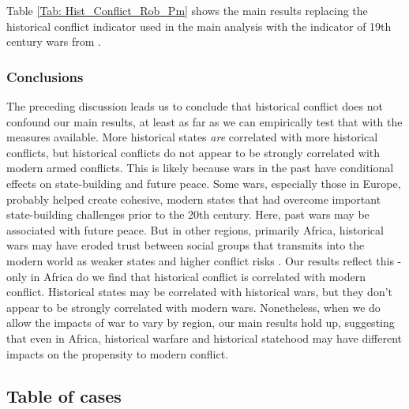 \documentclass[12pt]{article}
\begin{document}
Table \ref{Tab: Hist_Conflict_Rob_Pm} shows the main results replacing the historical conflict indicator used in the main analysis with the indicator of 19th century wars from \citet{Lyall2020}. 

     

\clearpage

\subsubsection{Conclusions}

The preceding discussion leads us to conclude that historical conflict does not confound our main results, at least as far as we can empirically test that with the measures available. More historical states \textit{are} correlated with more historical conflicts, but historical conflicts do not appear to be strongly correlated with modern armed conflicts. This is likely because wars in the past have conditional effects on state-building and future peace. Some wars, especially those in Europe, probably helped create cohesive, modern states that had overcome important state-building challenges prior to the 20th century. Here, past wars may be associated with future peace. But in other regions, primarily Africa, historical wars may have eroded trust between social groups that transmits into the modern world as weaker states and higher conflict risks \citep{Besley2014, Dincecco2019}. Our results reflect this - only in Africa do we find that historical conflict is correlated with modern conflict. Historical states may be correlated with historical wars, but they don't appear to be strongly correlated with modern wars. Nonetheless, when we do allow the impacts of war to vary by region, our main results hold up, suggesting that even in Africa, historical warfare and historical statehood may have different impacts on the propensity to modern conflict. 




\subsection{Table of cases}
 
 
 
 \pagebreak  
 
\end{document}
